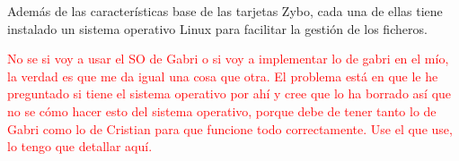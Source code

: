 Además de las características base de las tarjetas Zybo, cada una de ellas tiene instalado un sistema operativo Linux para facilitar la gestión de los ficheros.

\textcolor{red}{No se si voy a usar el SO de Gabri o si voy a implementar lo de gabri en el mío, la verdad es que me da igual una cosa que otra. El problema está en que le he preguntado si tiene el sistema operativo por ahí y cree que lo ha borrado así que no se cómo hacer esto del sistema operativo, porque debe de tener tanto lo de Gabri como lo de Cristian para que funcione todo correctamente. Use el que use, lo tengo que detallar aquí.}